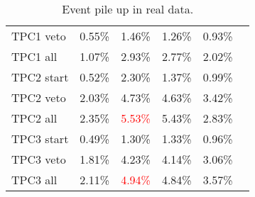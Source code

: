 \documentclass[../main.tex]{subfiles}
\begin{document}
\begin{table}
\begin{center}
\begin{tabular}{|l|c|c|c|c|c|}
  TPC1 veto   & 0.55\%  & 1.46\% & 1.26\% & 0.93\% &  \\
  TPC1 all    & 1.07\%  & 2.93\% & 2.77\% & 2.02\% & \\
  \hline
  TPC2 start  & 0.52\%  & 2.30\% & 1.37\% & 0.99\% & \\
  TPC2 veto   & 2.03\%  & 4.73\% & 4.63\% & 3.42\% &  \\
  TPC2 all    & 2.35\%  & \textcolor{red}{5.53\%} & 5.43\% & 2.83\% &\\
  \hline
  TPC3 start  & 0.49\%  & 1.30\% & 1.33\% & 0.96\% & \\
  TPC3 veto   & 1.81\%  & 4.23\% & 4.14\% & 3.06\% &  \\
  TPC3 all    & 2.11\%  & \textcolor{red}{4.94\%} & 4.84\% & 3.57\% &  \\
  \hline
\end{tabular}
\caption{Event pile up in real data.}
\label{tbl:HNL:pileUp}
\end{center}
\end{table}
\end{document}
